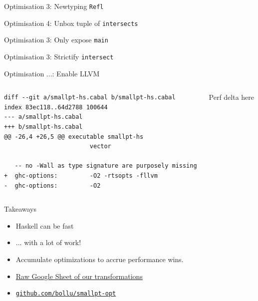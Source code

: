 \documentclass[8pt]{beamer}
\newcommand{\Refl}{\texttt{Refl}}
\newcommand{\main}{\texttt{main}}
\newcommand{\intersect}{\texttt{intersect}}
\newcommand{\intersects}{\texttt{intersects}}
\begin{document}
\begin{frame}[fragile]{Optimisation 3: Newtyping \Refl}
\end{frame}

\begin{frame}[fragile]{Optimisation 4: Unbox tuple of \intersects}
\end{frame}


\begin{frame}[fragile]{Optimisation 3: Only expose \main}
\end{frame}


\begin{frame}[fragile]{Optimisation 3: Strictify \intersect}
\end{frame}


\begin{frame}[fragile]{Optimisation ...: Enable LLVM}
\begin{columns}
\begin{column}{0.48\textwidth}
{\footnotesize
\begin{verbatim}
diff --git a/smallpt-hs.cabal b/smallpt-hs.cabal
index 83ec118..64d2788 100644
--- a/smallpt-hs.cabal
+++ b/smallpt-hs.cabal
@@ -26,4 +26,5 @@ executable smallpt-hs
                        vector

   -- no -Wall as type signature are purposely missing
+  ghc-options:         -O2 -rtsopts -fllvm
-  ghc-options:         -O2 
\end{verbatim}
}
\end{column}
\begin{column}{0.48\textwidth}
Perf delta here
\end{column}
\end{columns}
\end{frame}


\begin{frame}[fragile]{Takeaways}
\pause
\begin{itemize}
\item Haskell can be fast \pause
\item ... with a lot of work! \pause
\item Accumulate optimizations to accrue performance wins. \pause
\item \href{https://docs.google.com/spreadsheets/d/1YhZlDRGvnCtN8UQf_0ItmgRWI9MhL21HDTlBEKqgWHc/edit#gid=0}{Raw Google Sheet of our transformations}
\item \href{https://github.com/bollu/smallpths}{\texttt{github.com/bollu/smallpt-opt}}
\end{itemize}
\end{frame}
\end{document}
